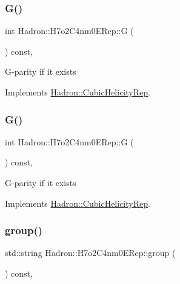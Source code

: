 \subsubsection{\texorpdfstring{G()}{G()}\hspace{0.1cm}{\footnotesize\ttfamily [2/3]}}
{\footnotesize\ttfamily int Hadron\+::\+H7o2\+C4nm0\+E\+Rep\+::G (\begin{DoxyParamCaption}{ }\end{DoxyParamCaption}) const\hspace{0.3cm}{\ttfamily [inline]}, {\ttfamily [virtual]}}

G-\/parity if it exists 

Implements \mbox{\hyperlink{structHadron_1_1CubicHelicityRep_a50689f42be1e6170aa8cf6ad0597018b}{Hadron\+::\+Cubic\+Helicity\+Rep}}.

\mbox{\label{structHadron_1_1H7o2C4nm0ERep_a41ed014e3b78c3dfc40b8e8afee43477}} 
\subsubsection{\texorpdfstring{G()}{G()}\hspace{0.1cm}{\footnotesize\ttfamily [3/3]}}
{\footnotesize\ttfamily int Hadron\+::\+H7o2\+C4nm0\+E\+Rep\+::G (\begin{DoxyParamCaption}{ }\end{DoxyParamCaption}) const\hspace{0.3cm}{\ttfamily [inline]}, {\ttfamily [virtual]}}

G-\/parity if it exists 

Implements \mbox{\hyperlink{structHadron_1_1CubicHelicityRep_a50689f42be1e6170aa8cf6ad0597018b}{Hadron\+::\+Cubic\+Helicity\+Rep}}.

\mbox{\label{structHadron_1_1H7o2C4nm0ERep_ae7293b4f57a530ceb630b43a1036f5c4}} 
\subsubsection{\texorpdfstring{group()}{group()}\hspace{0.1cm}{\footnotesize\ttfamily [1/3]}}
{\footnotesize\ttfamily std\+::string Hadron\+::\+H7o2\+C4nm0\+E\+Rep\+::group (\begin{DoxyParamCaption}{ }\end{DoxyParamCaption}) const\hspace{0.3cm}{\ttfamily [inline]}, {\ttfamily [virtual]}}

